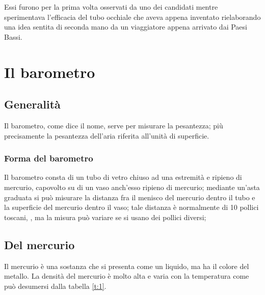 \documentclass[12pt,twoside,cucitura]{toptesi}
\begin{document}
Essi furono per la prima volta osservati da uno dei candidati mentre sperimentava l'efficacia del tubo occhiale che aveva appena inventato rielaborando una idea sentita di seconda mano da un viaggiatore appena arrivato dai Paesi Bassi.

\chapter{Il barometro}
\section{Generalità}
Il barometro, come dice il nome, serve per misurare la pesantezza; più precisamente la pesantezza dell'aria riferita all'unità di superficie.

\subsection{Forma del barometro}
Il barometro consta di un tubo di vetro chiuso ad una estremità e ripieno di mercurio, capovolto su di un vaso anch'esso ripieno di mercurio; mediante un'asta graduata si può misurare la distanza fra il menisco del mercurio dentro il tubo e la superficie del mercurio dentro il vaso; tale distanza è normalmente di 10 pollici toscani, \cite{tor1,tor2}, ma la misura può variare se si usano dei pollici diversi; 

\section{Del mercurio}
Il mercurio è una sostanza che si presenta come un liquido, ma ha il colore del metallo. La densità del mercurio \`e molto alta e varia con la temperatura come può desumersi dalla tabella \ref{t:1}.
\end{document}
